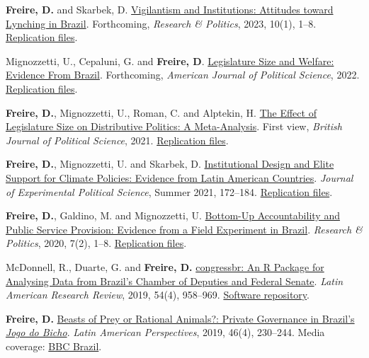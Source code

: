\documentclass[a4paper]{article}
\renewenvironment{itemize}{
	\begin{list}{}{
			\setlength{\leftmargin}{1.5em}
		}
		}{
	\end{list}
}
\begin{document}
\begin{itemize}
\item \textbf{Freire, D.} and Skarbek, D. \href{https://doi.org/10.1177/20531680221150389}{Vigilantism and Institutions: Attitudes toward Lynching in Brazil}. Forthcoming, \textit{Research \& Politics}, 2023, 10(1), 1--8. \href{https://github.com/danilofreire/lynching-experiment-brazil}{Replication files}.
\item Mignozzetti, U., Cepaluni, G. and \textbf{Freire, D}. \href{https://github.com/umbertomig/legislature-size-welfare}{Legislature Size and Welfare: Evidence From Brazil}. Forthcoming, \textit{American Journal of Political Science}, 2022. \href{https://github.com/umbertomig/legislature-size-welfare}{Replication files}.
\item \textbf{Freire, D.}, Mignozzetti, U., Roman, C. and Alptekin, H. \href{https://doi.org/10.1017/S0007123422000552}{The Effect of Legislature Size on Distributive Politics: A Meta-Analysis}. First view, \textit{British Journal of Political Science}, 2021. \href{https://github.com/danilofreire/legislature-size-meta-analysis}{Replication files}.
\item \textbf{Freire, D.}, Mignozzetti, U. and Skarbek, D. \href{http://dx.doi.org/10.1017/XPS.2020.19}{Institutional Design and Elite Support for Climate Policies: Evidence from Latin American Countries}. \textit{Journal of Experimental Political Science}, Summer 2021, 172--184. \href{https://doi.org/10.7910/DVN/VTA5OA}{Replication files}.
\item \textbf{Freire, D.}, Galdino, M. and Mignozzetti, U. \href{https://doi.org/10.1177%2F2053168020914444}{Bottom-Up Accountability and Public Service Provision: Evidence from a Field Experiment in Brazil}. \textit{Research \& Politics}, 2020, 7(2), 1--8. \href{https://github.com/umbertomig/tdp-accountability}{Replication files}.
\item McDonnell, R., Duarte, G. and \textbf{Freire, D.} \href{https://doi.org/10.25222/larr.447}{congressbr: An R Package for Analysing Data from Brazil's Chamber of Deputies and Federal Senate}. \textit{Latin American Research Review}, 2019, 54(4), 958--969. \href{https://github.com/duarteguilherme/congressbr}{Software repository}.
\item \textbf{Freire, D.} \href{https://doi.org/10.1177/0094582X19846519}{Beasts of Prey or Rational Animals?: Private Governance in Brazil's \emph{Jogo do Bicho}}. \textit{Latin American Perspectives}, 2019, 46(4), 230--244. Media coverage: \href{http://www.bbc.com/portuguese/brasil-40140693}{BBC Brazil}.

\end{itemize}
\end{document}
